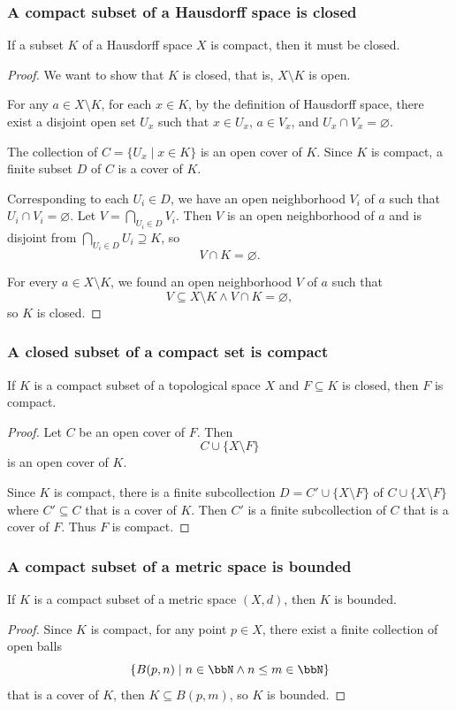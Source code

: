 \documentclass[a4paper,12pt]{article}
\begin{document}
\subsubsection{A compact subset of a Hausdorff space is closed}
If a subset $K$ of a Hausdorff space $X$ is compact, then it must be closed.
\begin{proof}
We want to show that $K$ is closed, that is, $X\setminus K$ is open.

For any $a\in X\setminus K$, for each $x\in K$, by the definition of Hausdorff space, there exist a disjoint open set $U_x$ such that $x\in U_x$, $a\in V_x$, and $U_x\cap V_x=\varnothing$.

The collection of $C=\{U_x\mid x\in K\}$ is an open cover of $K$. Since $K$ is compact, a finite subset $D$ of $C$ is a cover of $K$.

Corresponding to each $U_i\in D$, we have an open neighborhood $V_i$ of $a$ such that $U_i\cap V_i=\varnothing$. Let $V=\bigcap_{U_i\in D}V_i$. Then $V$ is an open neighborhood of $a$ and is disjoint from $\bigcap_{U_i\in D}U_i\supseteq K$, so
\[V\cap K=\varnothing.\]

For every $a\in X\setminus K$, we found an open neighborhood $V$ of $a$ such that
\[V\subseteq X\setminus K\land V\cap K=\varnothing,\]
so $K$ is closed.
\end{proof}
\subsubsection{A closed subset of a compact set is compact}
If $K$ is a compact subset of a topological space $X$ and $F\subseteq K$ is closed, then $F$ is compact.
\begin{proof}
Let $C$ be an open cover of $F$. Then
\[C\cup\{X\setminus F\}\]
is an open cover of $K$.

Since $K$ is compact, there is a finite subcollection $D=C'\cup\{X\setminus F\}$ of $C\cup\{X\setminus F\}$ where $C'\subseteq C$ that is a cover of $K$. Then $C'$ is a finite subcollection of $C$ that is a cover of $F$. Thus $F$ is compact.
\end{proof}
\subsubsection{A compact subset of a metric space is bounded}
If $K$ is a compact subset of a metric space $(X,d)$, then $K$ is bounded.
\begin{proof}
Since $K$ is compact, for any point $p\in X$, there exist a finite collection of open balls
\[\{B(p,n)\mid n\in\bbN\land n\leq m\in\bbN\}\]
that is a cover of $K$, then $K\subseteq B(p,m)$, so $K$ is bounded.
\end{proof}
\end{document}
